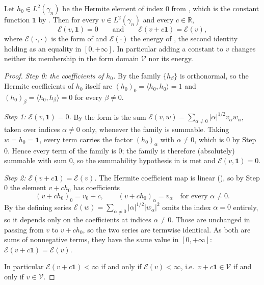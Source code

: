 \begin{lemma}
Let $h_0 \in L^2(\gamma_n)$ be the Hermite element of index $0$ from
, which is the constant function $\mathbf{1}$ by
.  Then for every $v \in L^2(\gamma_n)$ and every
$c \in \mathbb{R}$,
\[
  \mathcal{E}(v, \mathbf{1}) = 0
  \qquad\text{and}\qquad
  \mathcal{E}(v + c\mathbf{1}) = \mathcal{E}(v),
\]
where $\mathcal{E}(\cdot,\cdot)$ is the form of  and
$\mathcal{E}(\cdot)$ the energy of , the second identity holding
as an equality in $[0,+\infty]$.  In particular adding a constant to $v$ changes
neither its membership in the form domain $\mathcal{V}$ nor its energy.
\end{lemma}
\begin{proof}
\emph{Step 0: the coefficients of $h_0$.}
By  the family $\{h_\beta\}$ is orthonormal, so the
Hermite coefficients of $h_0$ itself are
$(h_0)_0 = \langle h_0,h_0\rangle = 1$ and
$(h_0)_\beta = \langle h_0,h_\beta\rangle = 0$ for every $\beta \neq 0$.

\emph{Step 1: $\mathcal{E}(v,\mathbf{1}) = 0$.}
By  the form is the sum
$\mathcal{E}(v,w) = \sum_{\alpha \neq 0} |\alpha|^{1/2} v_\alpha w_\alpha$,
taken over indices $\alpha \neq 0$ only, whenever the family is summable.  Taking
$w = h_0 = \mathbf{1}$, every term carries the factor $(h_0)_\alpha$ with
$\alpha \neq 0$, which is $0$ by Step 0.  Hence every term of the family is $0$;
the family is therefore (absolutely) summable with sum $0$, so the summability
hypothesis in  is met and
$\mathcal{E}(v, \mathbf{1}) = 0$.

\emph{Step 2: $\mathcal{E}(v + c\mathbf{1}) = \mathcal{E}(v)$.}
The Hermite coefficient map is linear (), so by Step 0 the
element $v + c h_0$ has coefficients
\[
  (v + c h_0)_0 = v_0 + c,
  \qquad
  (v + c h_0)_\alpha = v_\alpha \quad\text{for every } \alpha \neq 0 .
\]
By  the defining series
$\mathcal{E}(w) = \sum_{\alpha\neq0}|\alpha|^{1/2}|w_\alpha|^2$ omits the index
$\alpha = 0$ entirely, so it depends only on the coefficients at indices
$\alpha \neq 0$.  Those are unchanged in passing from $v$ to $v + ch_0$, so the
two series are termwise identical.  As both are sums of nonnegative terms, they
have the same value in $[0,+\infty]$:
$\mathcal{E}(v + c\mathbf{1}) = \mathcal{E}(v)$.

In particular $\mathcal{E}(v+c\mathbf{1}) < \infty$ if and only if
$\mathcal{E}(v) < \infty$, i.e.\ $v + c\mathbf{1} \in \mathcal{V}$ if and only if
$v \in \mathcal{V}$.
\end{proof}
